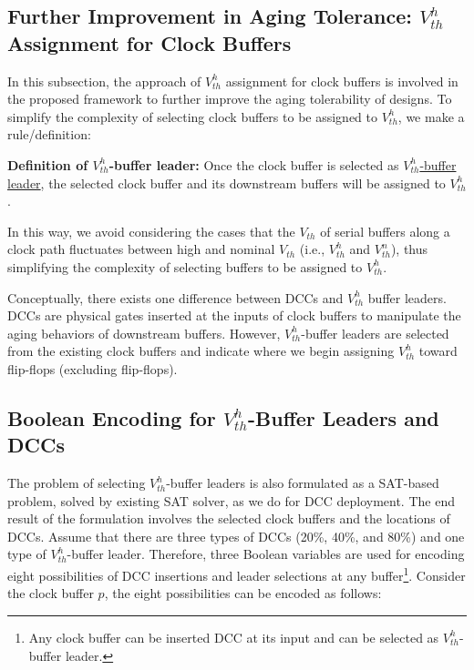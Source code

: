 \subsection{Further Improvement in Aging Tolerance: $V_{th}^h$ Assignment for Clock Buffers}
In this subsection, the approach of $V_{th}^h$ assignment for clock buffers is involved in the proposed framework to further improve the aging tolerability of designs. To simplify the complexity of selecting clock buffers to be assigned to $V_{th}^h$, we make a rule/definition: 

\noindent \textbf{Definition of $V_{th}^h$-buffer leader:} Once the clock buffer is selected as \uline{$V_{th}^h$-buffer leader}, the selected clock buffer and its downstream buffers will be assigned to $V_{th}^h$. 

In this way, we avoid considering the cases that the $V_{th}$ of serial buffers along a clock path fluctuates between high and nominal $V_{th}$ (i.e., $V_{th}^h$ and $V_{th}^n$), thus simplifying the complexity of selecting buffers to be assigned to $V_{th}^h$.

Conceptually, there exists one difference between DCCs and $V_{th}^h$ buffer leaders. DCCs are physical gates inserted at the inputs of clock buffers to manipulate the aging behaviors of downstream buffers. However, $V_{th}^h$-buffer leaders are selected from the existing clock buffers and indicate where we begin assigning $V_{th}^h$ toward flip-flops (excluding flip-flops).

\subsection{Boolean Encoding for $V_{th}^h$-Buffer Leaders and DCCs}
The problem of selecting $V_{th}^h$-buffer leaders is also formulated as a SAT-based problem, solved by existing SAT solver, as we do for DCC deployment. The end result of the formulation involves the selected clock buffers and the locations of DCCs. Assume that there are three types of DCCs (20\%, 40\%, and 80\%) and one type of $V_{th}^h$-buffer leader. Therefore, three Boolean variables are used for encoding eight possibilities of DCC insertions and leader selections at any buffer\footnote{Any clock buffer can be inserted DCC at its input and can be selected as $V_{th}^h$-buffer leader.}. Consider the clock buffer $p$, the eight possibilities can be encoded as follows:

